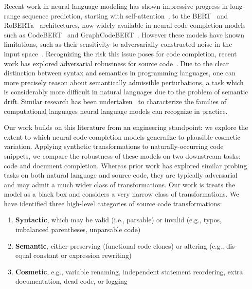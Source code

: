 \documentclass{article} %
\begin{document}
Recent work in neural language modeling has shown impressive progress in long-range sequence prediction, starting with self-attention~\citep{vaswani2017attention}, to the BERT~\citep{devlin2018bert} and RoBERTa~\citep{liu2019roberta} architectures, now widely available in neural code completion models such as CodeBERT~\citep{feng2020codebert} and GraphCodeBERT~\citep{guo2021graphcodebert}. However these models have known limitations, such as their sensitivity to adversarially-constructed noise in the input space~\cite{sun2020adv}. Recognizing the risk this issue poses for code completion, recent work has explored adversarial robustness for source code~\citep{bielik2020adversarial, zhou2021adversarial}. Due to the clear distinction between syntax and semantics in programming languages, one can more precisely reason about semantically admissible perturbations, a task which is considerably more difficult in natural languages due to the problem of semantic drift. Similar research has been undertaken~\citep{weiss2018practical, chirkova2020empirical, chen2021evaluating} to characterize the families of computational languages neural language models can recognize in practice.

Our work builds on this literature from an engineering standpoint: we explore the extent to which neural code completion models generalize to plausible cosmetic variation. Applying synthetic transformations to naturally-occurring code snippets, we compare the robustness of these models on two downstream tasks: code and document completion. Whereas prior work has explored similar probing tasks on both natural language and source code, they are typically adversarial and may admit a much wider class of transformations. Our work is treats the model as a black box and considers a very narrow class of transformations. We have identified three high-level categories of source code transformations:

\begin{enumerate}[itemsep=1ex]
  \item \textbf{Syntactic}, which may be valid (i.e., parsable) or invalid (e.g., typos, imbalanced parentheses, unparsable code)
  \item \textbf{Semantic}, either preserving (functional code clones) or altering (e.g., dis-equal constant or expression rewriting)
  \item \textbf{Cosmetic}, e.g., variable renaming, independent statement reordering, extra documentation, dead code, or logging
\end{enumerate}
\end{document}
